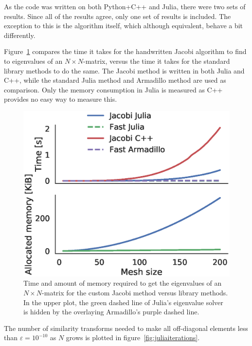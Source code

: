 \documentclass[aps,reprint]{revtex4-1}
\begin{document}
As the code was written on both Python+C++ and Julia, there were two sets of
results. Since all of the results agree, only one set of results is included.
The exception to this is the algorithm itself, which although equivalent, behave
a bit differently.

Figure~\ref{fig:juliatiming} compares the time it takes for the handwritten
Jacobi algorithm to find to eigenvalues of an \(N\times N\)-matrix, versus the
time it takes for the standard library methods to do the same. The Jacobi method
is written in both Julia and C++, while the standard Julia method and Armadillo
method are used as comparison. Only the memory consumption in Julia is measured
as C++ provides no easy way to measure this.

\begin{figure}[H]
  \centering
  \includegraphics[width=\columnwidth]{figures/juliatime.eps}
  \caption{\label{fig:juliatiming} Time and amount of memory required to get the eigenvalues of an
    \(N\times N\)-matrix for the custom Jacobi method versus library methods. In
  the upper plot, the green dashed line of Julia's eigenvalue solver is hidden
  by the overlaying Armadillo's purple dashed line.}
\end{figure}

The number of similarity transforms needed to make all off-diagonal elements
less than \(\varepsilon=10^{-10}\) as \(N\) grows is plotted in
figure~\ref{fig:juliaiterations}.
\end{document}
